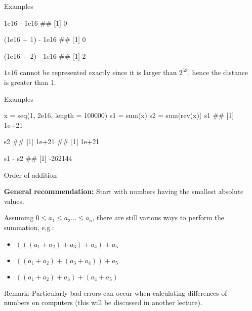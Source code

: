 \begin{vbframe}{Examples}
\footnotesize
\vspace{0.5cm}
\begin{verbbox}
1e16 - 1e16
## [1] 0
\end{verbbox}
\col
\vspace{0.2cm}
\begin{verbbox}
(1e16 + 1) - 1e16
## [1] 0
\end{verbbox}
\col
\vspace{0.2cm}
\begin{verbbox}
(1e16 + 2) - 1e16
## [1] 2
\end{verbbox}
\col
\lz
\normalsize
$1e16$ cannot be represented exactly since it is larger than $2^{53}$, hence the distance is greater than 1.
\end{vbframe}



\begin{vbframe}{Examples}
\lz
\footnotesize
\begin{verbbox}
x = seq(1, 2e16, length = 100000)
s1 = sum(x)
s2 = sum(rev(x))
s1
## [1] 1e+21
\end{verbbox}
\col
\vspace{0.3cm}
\begin{verbbox}
s2
## [1] 1e+21
## [1] 1e+21
\end{verbbox}
\col
\vspace{0.3cm}
\begin{verbbox}
s1 - s2
## [1] -262144
\end{verbbox}
\col
\end{vbframe}

\normalsize

\begin{vbframe}{Order of addition}

{\bf General recommendation:} Start with numbers having the smallest absolute values.

\lz

Assuming $0 \leq a_1 \leq a_2 \dots \leq a_n$, there are still various ways to perform the summation, e.g.:
\begin{itemize}
\item $ (( (a_1 + a_2) + a_3) + a_4) + a_5$
\item $ ((a_1 + a_2) + (a_3 + a_4) ) + a_5$
\item $ ((a_1 + a_2) + a_3) + (a_4 + a_5)$
\end{itemize}

\lz

Remark: Particularly bad errors can occur when calculating differences of numbers on computers (this will be discussed in another lecture). 

\end{vbframe}


